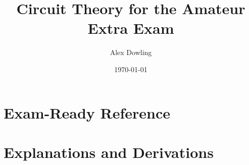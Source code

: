 \documentclass[11pt,letterpaper,oneside,openany]{book}
\title{Circuit Theory for the Amateur Extra Exam}
\author{Alex Dowling}
\date{\today}
\begin{document}
\frontmatter
{}

\cleardoublepage
{}




\tableofcontents

\mainmatter
\part{Exam-Ready Reference}


\part{Explanations and Derivations}

















\appendix






\backmatter
\nocite{worddraft,arrl_extra_12,extra_pool_2020,romanchik_extra_2016,shellhamer_extra_2017}


\end{document}
